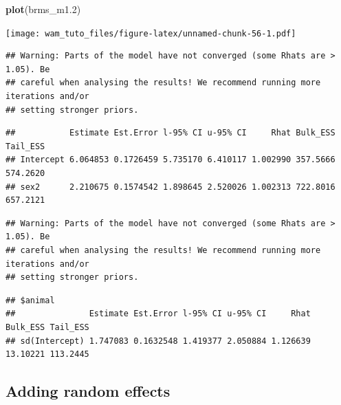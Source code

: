 \documentclass[
  12pt,
]{book}
\newenvironment{Shaded}{\begin{snugshade}}{\end{snugshade}}
\newcommand{\FloatTok}[1]{\textcolor[rgb]{0.00,0.00,0.81}{#1}}
\newcommand{\KeywordTok}[1]{\textcolor[rgb]{0.13,0.29,0.53}{\textbf{#1}}}
\newcommand{\NormalTok}[1]{#1}
\newcommand{\OperatorTok}[1]{\textcolor[rgb]{0.81,0.36,0.00}{\textbf{#1}}}
\begin{document}
\begin{Shaded}
\begin{Highlighting}[]
\KeywordTok{plot}\NormalTok{(brms\_m1}\FloatTok{.2}\NormalTok{)}
\end{Highlighting}
\end{Shaded}

\texttt{[image: wam\_tuto\_files/figure-latex/unnamed-chunk-56-1.pdf]}

\begin{Shaded}
\end{Shaded}

\begin{verbatim}
## Warning: Parts of the model have not converged (some Rhats are > 1.05). Be
## careful when analysing the results! We recommend running more iterations and/or
## setting stronger priors.
\end{verbatim}

\begin{verbatim}
##           Estimate Est.Error l-95% CI u-95% CI     Rhat Bulk_ESS Tail_ESS
## Intercept 6.064853 0.1726459 5.735170 6.410117 1.002990 357.5666 574.2620
## sex2      2.210675 0.1574542 1.898645 2.520026 1.002313 722.8016 657.2121
\end{verbatim}

\begin{Shaded}
\end{Shaded}

\begin{verbatim}
## Warning: Parts of the model have not converged (some Rhats are > 1.05). Be
## careful when analysing the results! We recommend running more iterations and/or
## setting stronger priors.
\end{verbatim}

\begin{verbatim}
## $animal
##               Estimate Est.Error l-95% CI u-95% CI     Rhat Bulk_ESS Tail_ESS
## sd(Intercept) 1.747083 0.1632548 1.419377 2.050884 1.126639 13.10221 113.2445
\end{verbatim}

\hypertarget{adding-random-effects-2}{%
\subsection{Adding random effects}\label{adding-random-effects-2}}
\end{document}
